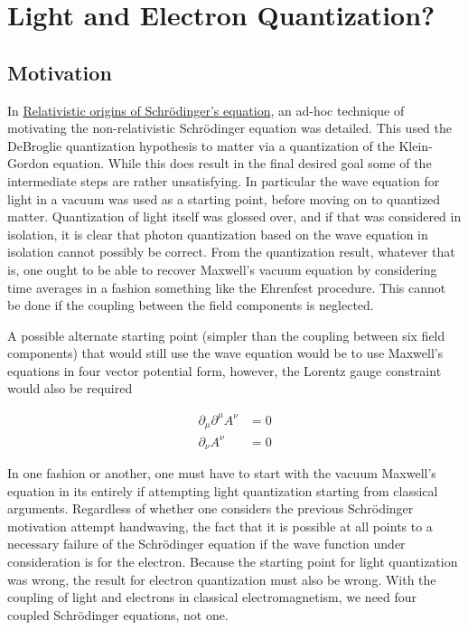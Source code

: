 %

\chapter{Light and Electron Quantization?}
\label{chap:lightQuantize}
\date{July 2, 2009}


\beginArtWithToc

\section{Motivation}

In \href{http://sites.google.com/site/peeterjoot/math2009/relwave.pdf}{Relativistic origins of Schr\"odinger's equation}, an ad-hoc technique of motivating the non-relativistic Schr\"odinger equation was detailed.  This used the DeBroglie quantization hypothesis to matter via a quantization of the Klein-Gordon equation.  While this  does result in the final desired goal some of the intermediate steps are rather unsatisfying.  In particular the wave equation for light in a vacuum was used as a starting point, before moving on to quantized matter.  Quantization of light itself was glossed over, and if that was considered in isolation, it is clear that photon quantization based on the wave equation in isolation cannot possibly be correct.  From the quantization result, whatever that is, one ought to be able to recover Maxwell's vacuum equation by considering time averages in a fashion something like the Ehrenfest procedure.  This cannot be done if the coupling between the field components is neglected.

A possible alternate starting point (simpler than the coupling between six field components) that would still use the wave equation would be to use Maxwell's equations in four vector potential form, however, the Lorentz gauge constraint would also be required

\begin{align}\label{eqn:maxwellPotVacuum}
\partial_\mu \partial^\mu A^\nu &= 0 \\
\partial_\nu A^\nu &= 0
\end{align}

In one fashion or another, one must have to start with the vacuum Maxwell's equation in its entirely if attempting light quantization starting from classical arguments.  Regardless of whether one considers the previous Schr\"odinger motivation attempt handwaving, the fact that it is possible at all points to a necessary failure of the Schr\"odinger equation if the wave function under consideration is for the electron.  Because the starting point for light quantization was wrong, the result for electron quantization must also be wrong.  With the coupling of light and electrons in classical electromagnetism, we need four coupled Schr\"odinger equations, not one.

